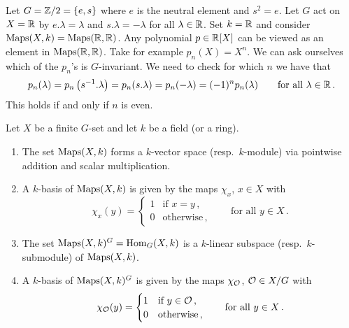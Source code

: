 \begin{expl}
  Let $G = \mathbb{Z}/2 = \{e,s\}$ where $e$ is the neutral element and $s^2 = e$.
  Let $G$ act on $X = \mathbb{R}$ by $e.\lambda = \lambda$ and $s.\lambda = -\lambda$ for all $\lambda \in \mathbb{R}$.
  Set $k = \mathbb{R}$ and consider $\operatorname{Maps}(X,k) = \operatorname{Maps}(\mathbb{R},\mathbb{R})$.
  Any polynomial $p \in \mathbb{R}[X]$ can be viewed as an element in $\operatorname{Maps}(\mathbb{R},\mathbb{R})$.
  Take for example $p_n(X) = X^n$.
  We can ask ourselves which of the $p_n$’s is $G$-invariant.
  We need to check for which $n$ we have that
  \[
      p_n(\lambda)
    = p_n\left( s^{-1}.\lambda \right)
    = p_n(s.\lambda)
    = p_n(-\lambda)
    = (-1)^n p_n(\lambda)
    \qquad
    \text{for all $\lambda \in \mathbb{R}$} \,.
  \]
  This holds if and only if $n$ is even.
\end{expl}


\begin{lem}\label{lem: basis of Maps and Hom}
  Let $X$ be a finite $G$-set and let $k$ be a field \textup(or a ring\textup).
  \begin{enumerate}[label=\alph*),leftmargin=*]
    \item
      The set $\operatorname{Maps}(X,k)$ forms a $k$-vector space \textup(resp.\ $k$-module\textup) via pointwise addition and scalar multiplication.
    \item
      A $k$-basis of $\operatorname{Maps}(X,k)$ is given by the maps $\chi_x$, $x \in X$ with
      \[
          \chi_x(y)
        = \begin{cases}
            1 & \text{if $x = y$} \,, \\
            0 & \text{otherwise} \,,
          \end{cases}
        \qquad
        \text{for all $y \in X$} \,.
      \]
    \item
      \label{enum: invariants form a submodule}
      The set $\operatorname{Maps}(X,k)^G = \operatorname{Hom}_G(X,k)$ is a $k$-linear subspace \textup(resp.\ $k$-submodule\textup) of $\operatorname{Maps}(X,k)$.
    \item
      A $k$-basis of $\operatorname{Maps}(X,k)^G$ is given by the maps $\chi_\mathcal{O}$, $\mathcal{O} \in X/G$ with
      \[
          \chi_\mathcal{O}(y)
        = \begin{cases}
            1 & \text{if $y \in \mathcal{O}$} \,,  \\
            0 & \text{otherwise} \,,
          \end{cases}
        \qquad
        \text{for all $y \in X$} \,.
      \]
  \end{enumerate}
\end{lem}
